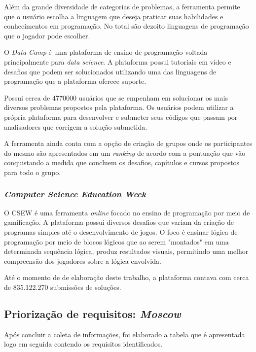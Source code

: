 Além da grande diversidade de categorias de problemas, a ferramenta permite que o usuário escolha a linguagem que deseja
praticar suas habilidades e conhecimentos em programação. No total são dezoito linguagens de programação que o jogador pode 
escolher.

O \textit{Data Camp} é uma plataforma de ensino de programação voltada principalmente para \textit{data science}.
A plataforma possui tutoriais em vídeo e desafios que podem ser solucionados utilizando uma das linguagens de programação
que a plataforma oferece suporte. \cite{datacamp}

Possui cerca de 4770000 usuários que se empenham em solucionar os mais diversos problemas propostos pela plataforma. Os usuários
podem  utilizar a própria plataforma para desenvolver e submeter seus códigos que passam por analisadores que corrigem a solução submetida.

A ferramenta ainda conta com a opção de criação de grupos onde os participantes do mesmo são apresentados em um \textit{ranking} 
de acordo com a pontuação que vão conquistando a medida que concluem os desafios, capítulos e cursos propostos para todo o grupo.

\subsubsection{\textit{Computer Science Education Week}}
O CSEW é uma ferramenta \textit{online} focado no ensino de programação por meio de gamificação. A plataforma possui
diversos desafios que variam da criação de programas simples até o desenvolvimento de jogos. O foco é ensinar lógica de programação 
por meio de blocos lógicos que ao serem "montados" em uma determinada sequência lógica, produz resultados visuais, permitindo uma melhor
compreensão dos jogadores sobre a lógica envolvida.

Até o momento de de elaboração deste trabalho, a plataforma contava com cerca de 835.122.270 submissões de soluções.

\subsection{Priorização de requisitos: \textit{Moscow}}
Após concluir a coleta de informações, foi elaborado a tabela que é apresentada logo em seguida contendo os requisitos
identificados.

\pagebreak


